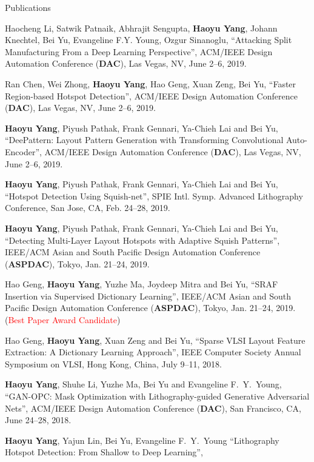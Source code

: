 \begin{rSection}{Publications}
\begin{description}[font=\normalfont]
	\item[{[C12]}]{
	Haocheng Li, Satwik Patnaik, Abhrajit Sengupta, \textbf{Haoyu Yang}, Johann Knechtel, Bei Yu, Evangeline F.Y. Young, Ozgur Sinanoglu, 
	``Attacking Split Manufacturing From a Deep Learning Perspective'',  
	ACM/IEEE Design Automation Conference (\textbf{DAC}), Las Vegas, NV, June 2--6, 2019.
	}
	\item[{[C11]}]{
	Ran Chen, Wei Zhong, \textbf{Haoyu Yang}, Hao Geng, Xuan Zeng, Bei Yu, ``Faster Region-based Hotspot Detection'',  
	ACM/IEEE Design Automation Conference (\textbf{DAC}), Las Vegas, NV, June 2--6, 2019.
	}
	\item[{[C10]}]{
	\textbf{Haoyu Yang}, Piyush Pathak, Frank Gennari, Ya-Chieh Lai and Bei Yu, ``DeePattern: Layout Pattern Generation with Transforming Convolutional Auto-Encoder'',  
	ACM/IEEE Design Automation Conference (\textbf{DAC}), Las Vegas, NV, June 2--6, 2019.
	}
	\item[{[C9]}]{
	\textbf{Haoyu Yang}, Piyush Pathak, Frank Gennari, Ya-Chieh Lai and Bei Yu, ``Hotspot Detection Using Squish-net'',  
	SPIE Intl. Symp. Advanced Lithography Conference, San Jose, CA, Feb. 24--28, 2019.
	}
	\item[{[C8]}]{
	\textbf{Haoyu Yang}, Piyush Pathak, Frank Gennari, Ya-Chieh Lai and Bei Yu, ``Detecting Multi-Layer Layout Hotspots with Adaptive Squish Patterns'',  
	IEEE/ACM Asian and South Pacific Design Automation Conference (\textbf{ASPDAC}), Tokyo, Jan. 21--24, 2019.
	}
	\item[{[C7]}]{
	Hao Geng, \textbf{Haoyu Yang}, Yuzhe Ma, Joydeep Mitra and Bei Yu, ``SRAF Insertion via Supervised Dictionary Learning'',  
	IEEE/ACM Asian and South Pacific Design Automation Conference (\textbf{ASPDAC}), Tokyo, Jan. 21--24, 2019. (\textcolor{red}{Best Paper Award Candidate})
	}
	\item[{[C6]}]{
		Hao Geng, \textbf{Haoyu Yang}, Xuan Zeng and Bei Yu, ``Sparse VLSI Layout Feature Extraction: A Dictionary Learning Approach'',  
		IEEE Computer Society Annual Symposium on VLSI, Hong Kong, China, July 9--11, 2018.
	}
	\item[{[C5]}]{
		\textbf{Haoyu Yang}, Shuhe Li, Yuzhe Ma, Bei Yu and Evangeline F.~Y.~Young, ``GAN-OPC: Mask Optimization with Lithography-guided Generative Adversarial Nets'', ACM/IEEE Design Automation Conference (\textbf{DAC}), San Francisco, CA, June 24--28, 2018. 
	}	
	\item[{[C4]}]{
		\textbf{Haoyu Yang}, Yajun Lin, Bei Yu, Evangeline F.~Y.~Young
		``Lithography Hotspot Detection: From Shallow to Deep Learning'',
}
\end{description}
\end{rSection}
